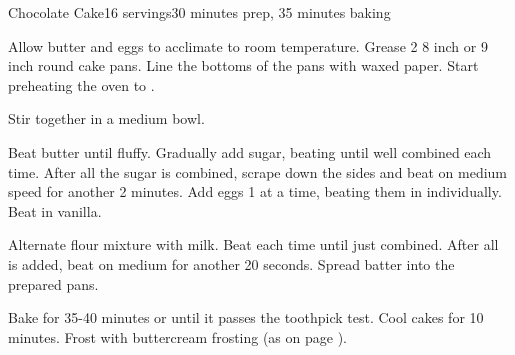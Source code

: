 \documentclass[../Cookbook.tex]{subfiles}
\begin{document}
\begin{recipe}{Chocolate Cake}{16 servings}{30 minutes prep, 35 minutes baking}

Allow butter and eggs to acclimate to room temperature. Grease 2 8 inch or 9  inch round cake pans. Line the bottoms of the pans with waxed paper. Start preheating the oven to .

Stir together in a medium bowl.

Beat butter until fluffy. Gradually add sugar, beating until well combined each time. After all the sugar is combined, scrape down the sides and beat on medium speed for another 2 minutes. Add eggs 1 at a time, beating them in individually. Beat in vanilla.

Alternate flour mixture with milk. Beat each time until just combined. After all is added, beat on medium for another 20 seconds. Spread batter into the prepared pans.

\newstep
Bake for 35-40 minutes or until it passes the toothpick test. Cool cakes for 10 minutes. Frost with buttercream frosting (as on page \pageref{buttercream}).

\end{recipe}
\end{document}

